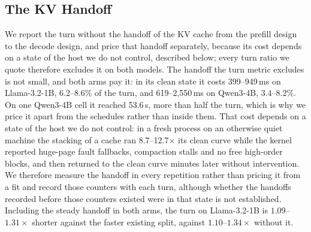 \subsection{The KV Handoff}
\label{app:handoff}

We report the turn without the handoff of the KV cache from the prefill design to the decode design, and price that handoff separately, because its cost depends on a state of the host we do not control, described below; every turn ratio we quote therefore excludes it on both models.
The handoff the turn metric excludes is not small, and both arms pay it: in its clean state it costs 399--949\,ms on Llama-3.2-1B, 6.2--8.6\% of the turn, and 619--2{,}550\,ms on Qwen3-4B, 3.4--8.2\%.
On one Qwen3-4B cell it reached 53.6\,s, more than half the turn, which is why we price it apart from the schedules rather than inside them. That cost depends on a state of the host we do not control: in a fresh process on an otherwise quiet machine the stacking of a cache ran 8.7--12.7$\times$ its clean curve while the kernel reported huge-page fault fallbacks, compaction stalls and no free high-order blocks, and then returned to the clean curve minutes later without intervention. We therefore measure the handoff in every repetition rather than pricing it from a fit and record those counters with each turn, although whether the handoffs recorded before those counters existed were in that state is not established.
Including the steady handoff in both arms, the turn on Llama-3.2-1B is $1.09$--$1.31\times$ shorter against the faster existing split, against $1.10$--$1.34\times$ without it.

